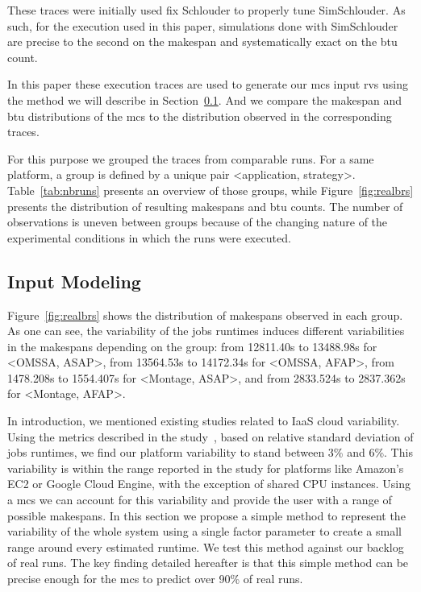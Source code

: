 \documentclass[10pt,conference,compsocconf]{IEEEtran}
\begin{document}
These traces were initially used fix Schlouder to properly 
tune SimSchlouder. As such, for the execution used in this paper, simulations
done with SimSchlouder are precise to the second on the makespan and
systematically exact on the \ac{btu} count. 

In this paper these execution traces are used to  generate our \ac{mcs} input
\acp{rv} using the method we will describe in Section~\ref{sec:im}. And we
compare the makespan  and \ac{btu}  distributions of the \ac{mcs} to the
distribution observed in the corresponding traces.

For this purpose we grouped the traces  from comparable runs.  For a same platform, 
a group is defined by a unique pair <application, strategy>.  
Table~\ref{tab:nbruns}  presents  an  overview   of  those groups,  while
Figure~\ref{fig:realbrs} presents the distribution of resulting makespans and \ac{btu} counts.
The number of observations is uneven between groups because of  the changing nature of
the    experimental   conditions    in   which    the   runs    were   executed.


\subsection{Input Modeling}\label{sec:im}

Figure~\ref{fig:realbrs} shows the distribution of makespans observed in each 
group. As one can see, the variability of the jobs runtimes induces different
variabilities in the makespans depending on the group:
from 12811.40s to 13488.98s for <OMSSA, ASAP>,
from 13564.53s to 14172.34s for <OMSSA, AFAP>,
from 1478.208s to 1554.407s for <Montage, ASAP>, and
from 2833.524s to 2837.362s for <Montage, AFAP>.


In introduction,
we mentioned existing studies related to IaaS cloud variability. Using the
metrics described in the study~\cite{LeitnerC16}, based on relative standard
deviation of jobs runtimes, we find our platform variability to stand between
3\% and 6\%. This variability is within the range reported in the study for
platforms like Amazon's EC2 or Google Cloud Engine, with the exception of shared
CPU instances.
Using a  \ac{mcs} we can account for this  variability and provide the
user with  a range of  possible makespans. In this  section we propose  a simple
method to  represent the variability of  the whole system using  a single factor
parameter to create  a small range around every estimated  runtime. We test this %
method against our backlog of real  runs.  The key finding detailed hereafter is
that this simple method  can be precise enough for the  \ac{mcs} to predict over
90\% of real runs.
\end{document}
